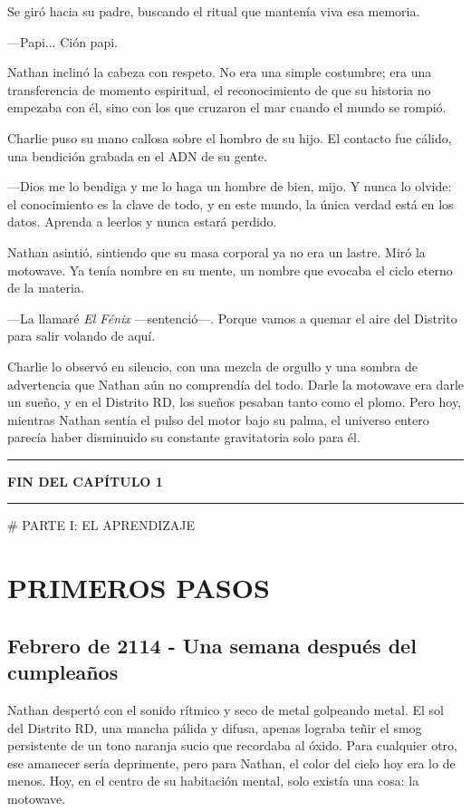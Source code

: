 \documentclass[12pt,a4paper]{book}
\begin{document}
Se giró hacia su padre, buscando el ritual que mantenía viva esa memoria.

---Papi... Ción papi.

Nathan inclinó la cabeza con respeto. No era una simple costumbre; era una transferencia de momento espiritual, el reconocimiento de que su historia no empezaba con él, sino con los que cruzaron el mar cuando el mundo se rompió.

Charlie puso su mano callosa sobre el hombro de su hijo. El contacto fue cálido, una bendición grabada en el ADN de su gente.

---Dios me lo bendiga y me lo haga un hombre de bien, mijo. Y nunca lo olvide: el conocimiento es la clave de todo, y en este mundo, la única verdad está en los datos. Aprenda a leerlos y nunca estará perdido.

Nathan asintió, sintiendo que su masa corporal ya no era un lastre. Miró la motowave. Ya tenía nombre en su mente, un nombre que evocaba el ciclo eterno de la materia.

---La llamaré \textit{El Fénix} ---sentenció---. Porque vamos a quemar el aire del Distrito para salir volando de aquí.

Charlie lo observó en silencio, con una mezcla de orgullo y una sombra de advertencia que Nathan aún no comprendía del todo. Darle la motowave era darle un sueño, y en el Distrito RD, los sueños pesaban tanto como el plomo. Pero hoy, mientras Nathan sentía el pulso del motor bajo su palma, el universo entero parecía haber disminuido su constante gravitatoria solo para él.

\bigskip
\noindent\rule{\textwidth}{0.4pt}
\bigskip

\textbf{FIN DEL CAPÍTULO 1}


\bigskip
\noindent\rule{\textwidth}{0.4pt}
\bigskip


# PARTE I: EL APRENDIZAJE

\chapter{PRIMEROS PASOS}

\section*{Febrero de 2114 - Una semana después del cumpleaños}

Nathan despertó con el sonido rítmico y seco de metal golpeando metal. El sol del Distrito RD, una mancha pálida y difusa, apenas lograba teñir el smog persistente de un tono naranja sucio que recordaba al óxido. Para cualquier otro, ese amanecer sería deprimente, pero para Nathan, el color del cielo hoy era lo de menos. Hoy, en el centro de su habitación mental, solo existía una cosa: la motowave.
\end{document}
